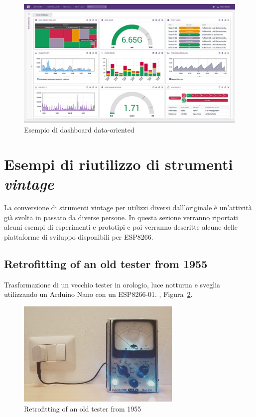\documentclass[12pt,a4paper]{report}
\begin{document}
\begin{figure}[h]
  \centering
  \includegraphics[width=\textwidth]{datadash}
  \caption{Esempio di dashboard data-oriented \cite{wiki:datadash}}
  \label{fig:datadash}
\end{figure}

\section{Esempi di riutilizzo di strumenti \textit{vintage}}%
La conversione di strumenti vintage per utilizzi diversi dall'originale è un'attività già svolta in passato da diverse persone. In questa
sezione verranno riportati alcuni esempi di esperimenti e prototipi e poi verranno descritte alcune delle piattaforme di sviluppo disponibili
per ESP8266.


\subsection{Retrofitting of an old tester from 1955}
Trasformazione di un vecchio tester in orologio, luce notturna e sveglia utilizzando un Arduino Nano con un ESP8266-01. 
\cite{retrofit1955}, Figura~\ref{fig:retrofit1955}.

\begin{figure}[h]
  \centering
  \includegraphics[width=0.7\textwidth]{retrofit1955}
  \caption{Retrofitting of an old tester from 1955 \cite{retrofit1955}}
  \label{fig:retrofit1955}
\end{figure}
\end{document}
